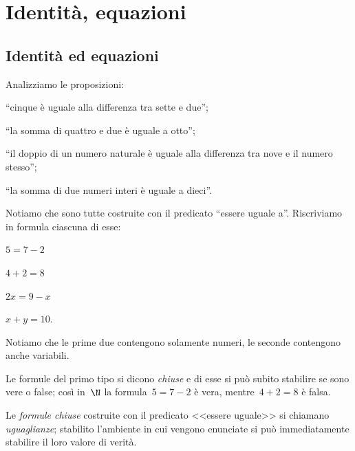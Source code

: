 


\chapter{Identità, equazioni}

\section{Identità ed equazioni}
\label{sec:13_definizioni}

Analizziamo le proposizioni:

\begin{enumeratea}
\item ``cinque è uguale alla differenza tra sette e due'';
\item ``la somma di quattro e due è uguale a otto'';
\item ``il doppio di un numero naturale è uguale alla differenza tra nove e il 
numero stesso'';
\item ``la somma di due numeri interi è uguale a dieci''.
\end{enumeratea}

Notiamo che sono tutte costruite con il predicato
``essere uguale a''. Riscriviamo in formula ciascuna di esse:
\begin{multicols}{4}
 \begin{enumeratea}
\item \(5=7-2\)
\item \(4+2=8\)
\item \(2x=9-x\)
\item \(x+y=10\).
\end{enumeratea}
\end{multicols}
Notiamo che le prime due contengono solamente numeri, le seconde
contengono anche variabili.

Le formule del primo tipo si dicono \emph{chiuse} e
di esse si può subito stabilire se sono vere o false; così in~\(\N\) la
formula~\(5 = 7 - 2\) è vera, mentre~\(4 + 2 = 8\) è falsa.

\begin{definizione}
 Le \emph{formule chiuse} costruite con il predicato
<<essere uguale>> si chiamano \emph{uguaglianze};
stabilito l'ambiente in cui vengono enunciate si può
immediatamente stabilire il loro valore di verità.
\end{definizione}

